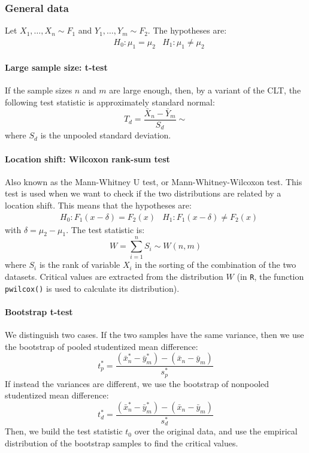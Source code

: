 \subsubsection{General data}
Let $X_1, \ldots, X_n \sim F_1$ and $Y_1, \ldots, Y_m \sim F_2$. The hypotheses are:
\begin{align*}
    &H_0 : \mu_1 = \mu_2 &H_1 : \mu_1 \not = \mu_2
\end{align*}

\paragraph{Large sample size: t-test}
If the sample sizes $n$ and $m$ are large enough, then, by a variant of the CLT, the following test statistic is approximately standard normal:
\begin{equation*}
    T_d = \frac{\bar{X}_n - \bar{Y}_m}{S_d} \sim 
\end{equation*}
where $S_d$ is the unpooled standard deviation.

\paragraph{Location shift: Wilcoxon rank-sum test}
Also known as the Mann-Whitney U test, or Mann-Whitney-Wilcoxon test. This test is used when we want to check if the two distributions are related by a location shift. This means that the hypotheses are:
\begin{align*}
    &H_0 : F_1(x - \delta) = F_2(x) &H_1 : F_1(x - \delta) \not = F_2(x)
\end{align*}
with $\delta = \mu_2 - \mu_1$. The test statistic is:
\begin{equation*}
    W = \sum_{i=1}^n S_i \sim W(n,m)
\end{equation*}
where $S_i$ is the rank of variable $X_i$ in the sorting of the combination of the two datasets. Critical values are extracted from the distribution $W$ (in \texttt{R}, the function \texttt{pwilcox()} is used to calculate its distribution).

\paragraph{Bootstrap t-test}
We distinguish two cases. If the two samples have the same variance, then we use the bootstrap of pooled studentized mean difference:
\begin{equation*}
    t_p^* = \frac{(\bar{x}_n^* - \bar{y}_m^*) - (\bar{x}_n - \bar{y}_m)}{s_p^*} 
\end{equation*}
If instead the variances are different, we use the bootstrap of nonpooled studentized mean difference:
\begin{equation*}
    t_d^* = \frac{(\bar{x}_n^* - \bar{y}_m^*) - (\bar{x}_n - \bar{y}_m)}{s_d^*}
\end{equation*}
Then, we build the test statistic $t_0$ over the original data, and use the empirical distribution of the bootstrap samples to find the critical values.

